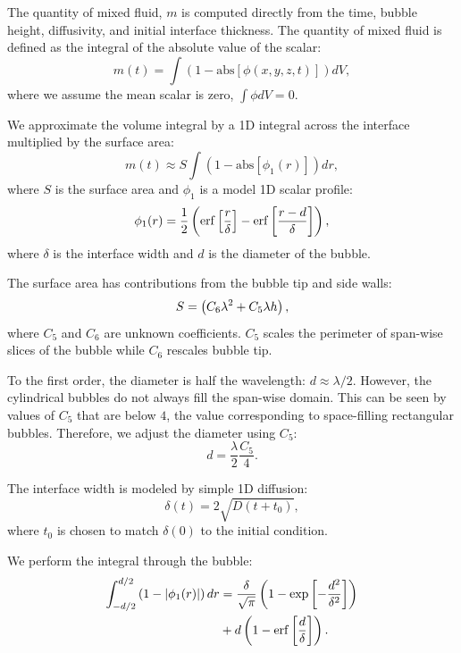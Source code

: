 The quantity of mixed fluid, $m$ is computed directly from the time, bubble height, diffusivity, and initial interface thickness.
The quantity of mixed fluid is defined as the integral of the absolute value of the scalar:
\begin{equation}
	m(t) = \int \left( 1-\text{abs}\left[\phi(x,y,z,t)\right] \right) dV,
\end{equation}
where we assume the mean scalar is zero, $\int \phi dV = 0$.

We approximate the volume integral by a 1D integral across the interface multiplied by the surface area:
\begin{equation}
	m(t) \approx S \int \left( 1- \text{abs}\left[\phi_1(r)\right] \right) dr,
\end{equation}
where $S$ is the surface area and
$\phi_1$ is a model 1D scalar profile:
\begin{equation}
\phi_1(r) = \frac{1}{2} \left( \operatorname{erf}\left[\frac{r}{\delta}\right] - \operatorname{erf}\left[\frac{r - d}{\delta}\right] \right),
\end{equation}
where $\delta$ is the interface width and
$d$ is the diameter of the bubble.

The surface area has contributions from the bubble tip and side walls:
\begin{equation} \elabel{surface_area}
S = \left(C_6 \lambda^2 + C_5 \lambda h\right),
\end{equation}
where $C_5$ and $C_6$ are unknown coefficients.
$C_5$ scales the perimeter of span-wise slices of the bubble while $C_6$ rescales bubble tip.

To the first order, the diameter is half the wavelength: $d \approx \lambda / 2$.
However, the cylindrical bubbles do not always fill the span-wise domain.
This can be seen by values of $C_5$ that are below $4$, the value corresponding to space-filling rectangular bubbles.
Therefore, we adjust the diameter using $C_5$:
\begin{equation}
d = \frac{\lambda}{2} \frac{C_5}{4}.
\end{equation}

The interface width is modeled by simple 1D diffusion:
\begin{equation}
\delta(t) = 2 \sqrt{D (t + t_0)},
\end{equation}
where $t_0$ is chosen to match $\delta(0)$ to the initial condition.

We perform the integral through the bubble:
\begin{equation} \elabel{profile1d}
\begin{split}
	\int_{-d/2}^{d/2} \left(1- \left|\phi_1(r)\right| \right) dr &= \frac{\delta}{\sqrt{\pi}} \left( 1 - \exp\left[-\frac{d^2}{\delta^2}\right]\right) \\
&+ d \left(1 - \erf\left[\frac{d}{\delta}\right]\right).
\end{split}
\end{equation}


